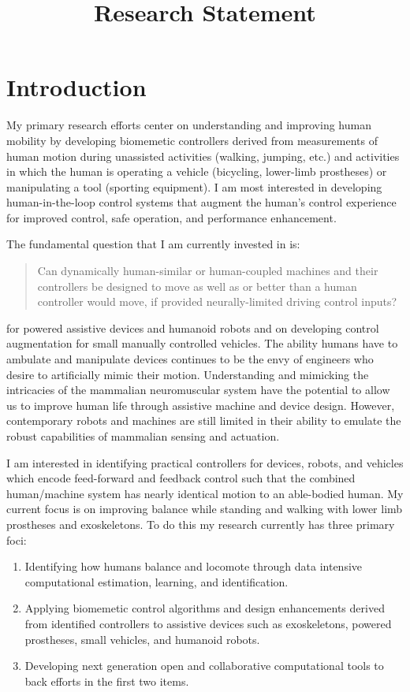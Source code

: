 \documentclass{article}
\title{Research Statement}
\date{}
\begin{document}
\maketitle

\section{Introduction}
%
My primary research efforts center on understanding and improving human
mobility by developing biomemetic controllers derived from measurements of
human motion during unassisted activities (walking, jumping, etc.) and
activities in which the human is operating a vehicle (bicycling, lower-limb
prostheses) or manipulating a tool (sporting equipment). I am most interested
in developing human-in-the-loop control systems that augment the human's
control experience for improved control, safe operation, and performance
enhancement.

The fundamental question that I am currently invested in is:

\begin{quote}
 Can dynamically human-similar or human-coupled machines and their controllers
 be designed to move as well as or better than a human controller would move,
 if provided neurally-limited driving control inputs?
\end{quote}

for powered assistive devices and humanoid
robots and on developing control augmentation for small manually controlled
vehicles. The ability humans have to ambulate and manipulate devices continues
to be the envy of engineers who desire to artificially mimic their motion.
Understanding and mimicking the intricacies of the mammalian neuromuscular
system have the potential to allow us to improve human life through assistive
machine and device design. However, contemporary robots and machines are still
limited in their ability to emulate the robust capabilities of mammalian
sensing and actuation.

I am interested in identifying practical controllers for devices, robots, and
vehicles which encode feed-forward and feedback control such that the combined
human/machine system has nearly identical motion to an able-bodied human. My
current focus is on improving balance while standing and walking with lower
limb prostheses and exoskeletons. To do this my research currently has three
primary foci:

\begin{enumerate}
  \item Identifying how humans balance and locomote through data intensive
    computational estimation, learning, and identification.
  \item Applying biomemetic control algorithms and design enhancements derived
    from identified controllers to assistive devices such as exoskeletons,
    powered prostheses, small vehicles, and humanoid robots.
  \item Developing next generation open and collaborative computational tools
    to back efforts in the first two items.
 \end{enumerate}
\end{document}
